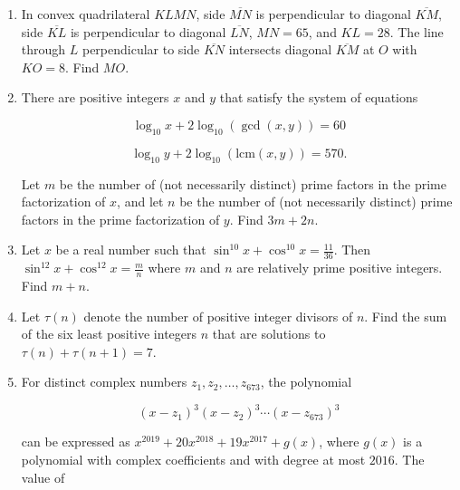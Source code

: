 \documentclass{article}
\begin{document}
\begin{enumerate}[label=\arabic*., itemsep=0.5em]
\vspace{0.5em}\item In convex quadrilateral $KLMN$, side $\overline{MN}$ is perpendicular to diagonal $\overline{KM}$, side $\overline{KL}$ is perpendicular to diagonal $\overline{LN}$, $MN = 65$, and $KL = 28$. The line through $L$ perpendicular to side $\overline{KN}$ intersects diagonal $\overline{KM}$ at $O$ with $KO = 8$. Find $MO$.\par \vspace{0.5em}\item There are positive integers $x$ and $y$ that satisfy the system of equations

\begin{equation*}
\log_{10} x + 2 \log_{10} (\gcd(x,y)) = 60
\end{equation*}
 
\begin{equation*}
\log_{10} y + 2 \log_{10} (\text{lcm}(x,y)) = 570.
\end{equation*}

Let $m$ be the number of (not necessarily distinct) prime factors in the prime factorization of $x$, and let $n$ be the number of (not necessarily distinct) prime factors in the prime factorization of $y$. Find $3m+2n$.\par \vspace{0.5em}\item Let $x$ be a real number such that $\sin^{10}x+\cos^{10} x = \tfrac{11}{36}$. Then $\sin^{12}x+\cos^{12} x = \tfrac{m}{n}$ where $m$ and $n$ are relatively prime positive integers. Find $m+n$.\par \vspace{0.5em}\item Let $\tau(n)$ denote the number of positive integer divisors of $n$. Find the sum of the six least positive integers $n$ that are solutions to $\tau (n) + \tau (n+1) = 7$.\par \vspace{0.5em}\item For distinct complex numbers $z_1,z_2,\dots,z_{673}$, the polynomial 

\begin{equation*}
(x-z_1)^3(x-z_2)^3 \cdots (x-z_{673})^3
\end{equation*}

can be expressed as $x^{2019} + 20x^{2018} + 19x^{2017}+g(x)$, where $g(x)$ is a polynomial with complex coefficients and with degree at most $2016$. The value of 


\end{enumerate}
\end{document}
